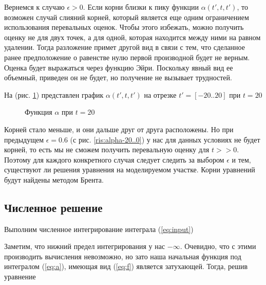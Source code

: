 \documentclass[%
bachelor,    %
natbib,      %
subf,        %
href,        %
colorlinks,  %
]{disser}
\newcommand{\sectionbreak}{\clearpage}
\begin{document}
Вернемся к случаю $\epsilon > 0$. Если корни близки к пику функции $\alpha(t', t, t')$, то возможен случай слияний корней, который является еще одним ограничением использования перевальных оценок.
Чтобы этого избежать, можно получить оценку не для двух точек, а для одной, которая находится между ними на равном удалении.
Тогда разложение примет другой вид в связи с тем, что сделанное ранее предположение о равенстве нулю первой производной будет не верным. Оценка будет выражаться через функцию Эйри.\cite{spec} Поскольку явный вид ее объемный, приведен он не будет, но получение не вызывает трудностей.

На (рис. \ref{ris:alpha-20..20}) представлен график $\alpha(t', t, t')$ на отрезке $t' = [-20..20]$ при $t = 20$ 

\begin{figure}[h]
	\caption{Функция $\alpha$ при $t = 20$}
	\label{ris:alpha-20..20}
\end{figure}

Корней стало меньше, и они дальше друг от друга расположены. Но при предыдущем $\epsilon = 0.6$ (с рис. \ref{ris:alpha-20..0}) у нас для данных условиях не будет корней, то есть мы не сможем получить перевальную оценку для $t>>0$.
Поэтому для каждого конкретного случая следует следить за выбором $\epsilon$ и тем, существуют ли решения уравнения на моделируемом участке.
Корни уравнений будут найдены методом Брента. \cite{tarasevych}
\sectionbreak

\subsection{Численное решение}

Выполним численное интегрирование интеграла (\ref{eq:input})

Заметим, что нижний предел интегрирования у нас $-\infty$. Очевидно, что с этими производить вычисления невозможно, но зато наша начальная функция под интегралом (\ref{eq:a}), имеющая вид (\ref{eq:f}) является затухающей. Тогда, решив уравнение 
\end{document}
